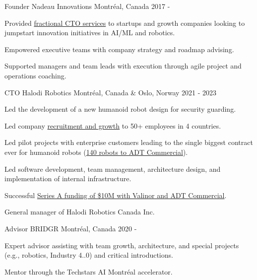 \begin{cventries}

    \cventry
    {Founder}
    {Nadeau Innovations}
    {Montréal, Canada}
    {2017 - }
    {
        \begin{cvitems}
            \item{Provided \href{https://www.nicholasnadeau.com/services/}{fractional CTO services} to startups and growth companies looking to jumpstart innovation initiatives in AI/ML and robotics.}
            \item{Empowered executive teams with company strategy and roadmap advising.}
            \item{Supported managers and team leads with execution through agile project and operations coaching.}
        \end{cvitems}
    }

    \cventry
    {CTO}
    {Halodi Robotics}
    {Montréal, Canada \& Oslo, Norway}
    {2021 - 2023}
    {
        \begin{cvitems}
            \item{Led the development of a new humanoid robot design for security guarding.}
            \item{Led company \href{https://www.nicholasnadeau.com/talk/society-robots-and-us-hiring-for-inclusive-robotics/}{recruitment and growth} to 50+ employees in 4 countries.}
            \item{Led pilot projects with enterprise customers leading to the single biggest contract ever for humanoid robots (\href{https://www.halodi.com/press-releases/halodi-robotics-inks-contract-with-adt-commercial-for-delivery-of-140-humanoid-robots}{140 robots to ADT Commercial}).}
            \item{Led software development, team management, architecture design, and implementation of internal infrastructure.}
            \item{Successful \href{https://www.halodi.com/press-releases/adt-invests-in-and-partners-with-halodi-robotics-lbz49}{Series A funding of \$10M with Valinor and ADT Commercial}.}
            \item{General manager of Halodi Robotics Canada Inc.}
        \end{cvitems}
    }

    \cventry
    {Advisor}
    {BRIDGR}
    {Montréal, Canada}
    {2020 - }
    {
        \begin{cvitems}
            \item{Expert advisor assisting with team growth, architecture, and special projects (e.g., robotics, Industry 4..0) and critical introductions.}
            \item{Mentor through the Techstars AI Montréal accelerator.}
        \end{cvitems}
    }


\end{cventries}
